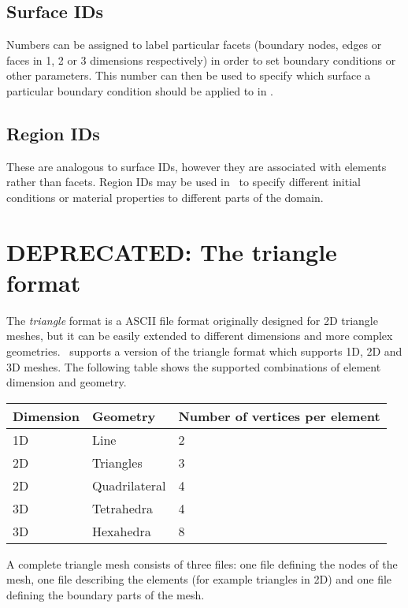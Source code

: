 \subsection{Surface IDs}\label{sec:surface_ids}
Numbers can be assigned to label particular facets (boundary nodes, edges or
faces in 1, 2 or 3 dimensions respectively) in order to set
boundary conditions or other parameters. This number can then be used to
specify which surface a particular boundary condition should be applied to
in \fluidity.

\subsection{Region IDs}\label{sec:region_ids}
 These are analogous to surface IDs, however they are
associated with elements rather than facets. Region IDs may be used in
\fluidity\ to specify different initial conditions or material properties to
different parts of the domain.



\section{DEPRECATED: The triangle format}\label{sec:triangle_format}

The \emph{triangle} format is a ASCII file format originally designed for 2D
triangle meshes, but it can be easily extended to different dimensions and
more complex geometries.  \fluidity\ supports a version of the triangle format
which supports 1D, 2D and 3D meshes.  The following table shows the supported
combinations of element dimension and geometry.

\begin{tabular}{ l l l }
\textbf{Dimension} & \textbf{Geometry} & \textbf{Number of vertices per element} \\ \hline
1D & Line & 2\\
2D & Triangles &  3 \\
2D & Quadrilateral & 4 \\
3D & Tetrahedra & 4 \\
3D & Hexahedra & 8 \\
\end{tabular}

A complete triangle mesh consists of three files: one file defining the
nodes of the mesh, one file describing the elements (for example triangles
in 2D) and one file defining the boundary parts of the mesh.


